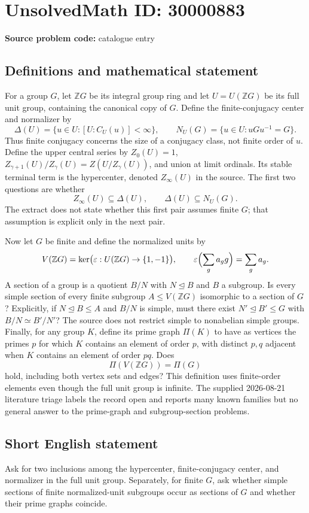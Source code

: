 \documentclass[11pt]{article}
\newcommand{\Z}{\mathbb{Z}}
\begin{document}
\section*{UnsolvedMath ID: 30000883}
\textbf{Source problem code:} catalogue entry
\subsection{Definitions and mathematical statement}
For a group $G$, let $\Z G$ be its integral group ring and let $U=U(\Z G)$ be its full unit group, containing the canonical copy of $G$. Define the finite-conjugacy center and normalizer by \[\Delta(U)=\{u\in U:[U:C_U(u)]<\infty\},\qquad N_U(G)=\{u\in U:uGu^{-1}=G\}.\] Thus finite conjugacy concerns the size of a conjugacy class, not finite order of $u$. Define the upper central series by $Z_0(U)=1$, $Z_{\gamma+1}(U)/Z_\gamma(U)=Z(U/Z_\gamma(U))$, and union at limit ordinals. Its stable terminal term is the hypercenter, denoted $Z_\infty(U)$ in the source. The first two questions are whether \[Z_\infty(U)\subseteq\Delta(U),\qquad\Delta(U)\subseteq N_U(G).\] The extract does not state whether this first pair assumes finite $G$; that assumption is explicit only in the next pair.\par Now let $G$ be finite and define the normalized units by \[V(\Z G)=\ker\bigl(\varepsilon:U(\Z G)\to\{1,-1\}\bigr),\qquad\varepsilon\Bigl(\sum_g a_gg\Bigr)=\sum_g a_g.\] A section of a group is a quotient $B/N$ with $N\trianglelefteq B$ and $B$ a subgroup. Is every simple section of every finite subgroup $A\leq V(\Z G)$ isomorphic to a section of $G$? Explicitly, if $N\trianglelefteq B\leq A$ and $B/N$ is simple, must there exist $N'\trianglelefteq B'\leq G$ with $B/N\simeq B'/N'$? The source does not restrict simple to nonabelian simple groups. Finally, for any group $K$, define its prime graph $\Pi(K)$ to have as vertices the primes $p$ for which $K$ contains an element of order $p$, with distinct $p,q$ adjacent when $K$ contains an element of order $pq$. Does \[\Pi(V(\Z G))=\Pi(G)\] hold, including both vertex sets and edges? This definition uses finite-order elements even though the full unit group is infinite. The supplied 2026-08-21 literature triage labels the record open and reports many known families but no general answer to the prime-graph and subgroup-section problems.
\subsection{Short English statement}
Ask for two inclusions among the hypercenter, finite-conjugacy center, and normalizer in the full unit group. Separately, for finite $G$, ask whether simple sections of finite normalized-unit subgroups occur as sections of $G$ and whether their prime graphs coincide.
\end{document}
